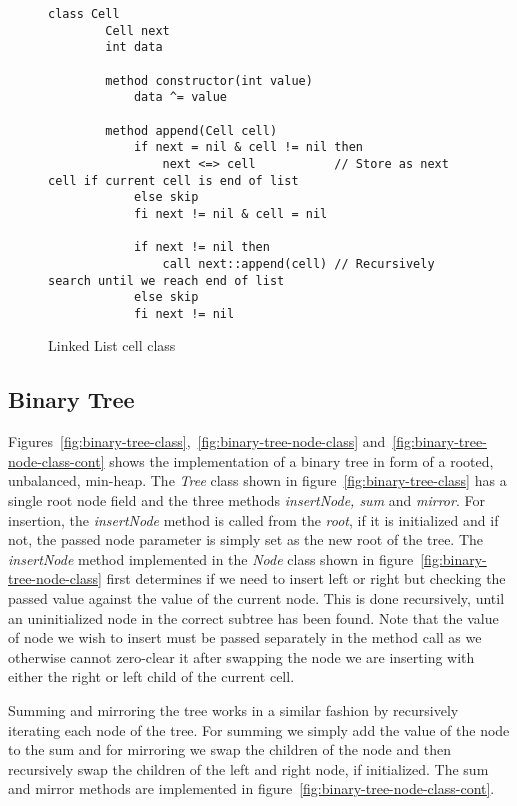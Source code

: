 \begin{figure}[ht!]
    \centering
    \begin{lstlisting}[style = basic, language = roopl] 
    class Cell
        Cell next
        int data
    
        method constructor(int value)
            data ^= value     
    
        method append(Cell cell)
            if next = nil & cell != nil then
                next <=> cell           // Store as next cell if current cell is end of list
            else skip
            fi next != nil & cell = nil
    
            if next != nil then
                call next::append(cell) // Recursively search until we reach end of list
            else skip
            fi next != nil
    \end{lstlisting}
    \caption{Linked List cell class}
    \label{fig:linked-list-cell-class}
\end{figure}

\subsection{Binary Tree}
\label{subsec:binary-tree}
Figures~\ref{fig:binary-tree-class},~\ref{fig:binary-tree-node-class} and~\ref{fig:binary-tree-node-class-cont} shows the implementation of a binary tree in form of a  rooted, unbalanced, min-heap. The \textit{Tree} class shown in figure~\ref{fig:binary-tree-class} has a single root node field and the three methods \textit{insertNode, sum} and \textit{mirror}. For insertion, the \textit{insertNode} method is called from the \textit{root}, if it is initialized and if not, the passed node parameter is simply set as the new root of the tree. The \textit{insertNode} method implemented in the \textit{Node} class shown in figure~\ref{fig:binary-tree-node-class} first determines if we need to insert left or right but checking the passed value against the value of the current node. This is done recursively, until an uninitialized node in the correct subtree has been found. Note that the value of node we wish to insert must be passed separately in the method call as we otherwise cannot zero-clear it after swapping the node we are inserting with either the right or left child of the current cell.

Summing and mirroring the tree works in a similar fashion by recursively iterating each node of the tree. For summing we simply add the value of the node to the sum and for mirroring we swap the children of the node and then recursively swap the children of the left and right node, if initialized. The sum and mirror methods are implemented in figure~\ref{fig:binary-tree-node-class-cont}.


